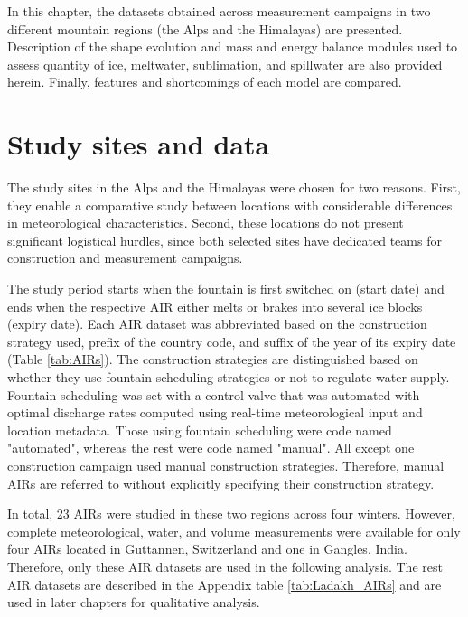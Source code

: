 In this chapter, the datasets obtained across measurement campaigns in two different mountain regions (the Alps
and the Himalayas) are presented. Description of the shape evolution and mass and energy balance modules used to
assess quantity of ice, meltwater, sublimation, and spillwater are also provided herein. Finally, features and
shortcomings of each model are compared.

\section{Study sites and data}

The study sites in the Alps and the Himalayas were chosen for two reasons. First, they enable a comparative
study between locations with considerable differences in meteorological characteristics. Second, these locations
do not present significant logistical hurdles, since both selected sites have dedicated teams for construction
and measurement campaigns.

The study period starts when the fountain is first switched on (start date) and ends when the respective
\ac{AIR} either melts or brakes into several ice blocks (expiry date). Each \ac{AIR} dataset was abbreviated
based on the construction strategy used, prefix of the country code, and suffix of the year of its expiry date
(Table \ref{tab:AIRs}). The construction strategies are distinguished based on whether they use fountain
scheduling strategies or not to regulate water supply. Fountain scheduling was set with a control valve that was
automated with optimal discharge rates computed using real-time meteorological input and location metadata.
Those using fountain scheduling were code named "automated", whereas the rest were code named "manual". All
except one construction campaign used manual construction strategies. Therefore, manual \ac{AIRs} are referred
to without explicitly specifying their construction strategy.

In total, 23 \ac{AIRs} were studied in these two regions across four winters. However, complete meteorological,
water, and volume measurements were available for only four \ac{AIRs} located in Guttannen, Switzerland and one
in Gangles, India. Therefore, only these \ac{AIR} datasets are used in the following analysis. The rest \ac{AIR}
datasets are described in the Appendix table \ref{tab:Ladakh_AIRs} and are used in later chapters for
qualitative analysis.

